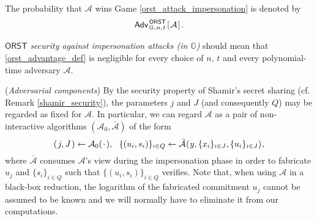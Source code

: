 \documentclass{iacrtrans}
\begin{document}
\noindent
The probability that  $\mathcal{A}$ wins
Game \ref{orst_attack_impersonation}
is denoted by
\vspace{5pt}
\begin{equation}\label{orst_advantage_def}
\mathsf{Adv}
	_{\hspace{1pt}\mathbb{G},\hspace{0.5pt} n,\hspace{0.5pt} t}
	^{\hspace{1pt}\mathsf{ORST}}
	\hspace{1pt}
		[\hspace{1pt}
			\mathcal{A}
		\hspace{1pt}]\hspace{1pt}.
\vspace{5pt}
\end{equation}

\noindent
$\mathsf{ORST}$ \textit{security against impersonation attacks
\textup{(\textit{in} $\mathbb{G}$)}}
should mean that \eqref{orst_advantage_def}
is negligible for every choice of $n,\hspace{2pt} t$
and every polynomial-time adversary $\mathcal{A}$.

\begin{rem}\label{rem_adversarial_components}
(\textit{Adversarial components})
By the security property of
Shamir's secret sharing (cf. Remark \ref{shamir_security}),
the parameters $j$ and $J$ (and consequently $Q$)
may be regarded as fixed for $\mathcal{A}$.
In particular, we can regard $\mathcal{A}$ as
a pair of non-interactive algorithms
$(\mathcal{A}_0, \mathcal{\bar{A}})$
of the form
\vspace{5pt}
\begin{equation*}\label{adversary_internal}
(\hspace{1pt}j, J\hspace{1pt})
\leftarrow
\mathcal{A}_0(\hspace{1pt}\cdot\hspace{1pt}),\ \ \{(u_i, s_i)\}_{i \in Q} \leftarrow
\mathcal{\bar{A}}\hspace{0.5pt}
	(
		\hspace{0.5pt}
		y,
		\{x_i\}_{i \in J},
		\{u_i\}_{i \in J}
	)
\hspace{0.5pt},
\vspace{5pt}
\end{equation*}
where $\mathcal{\bar{A}}$ consumes $\mathcal{A}$'s view
during the impersonation phase
in order to fabricate $u_j$ and
$\{s_i\}_{i \in Q}$ such that
$\{(u_i, s_i)\}_{i \in Q}$ verifies.
Note that, when using $\mathcal{A}$
in a black-box reduction,
the logarithm of the fabricated commitment $u_j$
cannot be assumed to be known
and we will normally have to
eliminate it from our computations.
\end{rem}
\end{document}
